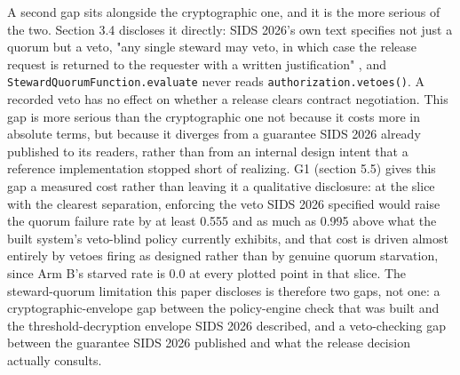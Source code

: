A second gap sits alongside the cryptographic one, and it is the more serious of the two. Section 3.4 discloses it directly: SIDS 2026's own text specifies not just a quorum but a veto, "any single steward may veto, in which case the release request is returned to the requester with a written justification" \cite{katrakazas2026}, and \texttt{StewardQuorumFunction.evaluate} never reads \texttt{authorization.vetoes()}. A recorded veto has no effect on whether a release clears contract negotiation. This gap is more serious than the cryptographic one not because it costs more in absolute terms, but because it diverges from a guarantee SIDS 2026 already published to its readers, rather than from an internal design intent that a reference implementation stopped short of realizing. G1 (section 5.5) gives this gap a measured cost rather than leaving it a qualitative disclosure: at the slice with the clearest separation, enforcing the veto SIDS 2026 specified would raise the quorum failure rate by at least 0.555 and as much as 0.995 above what the built system's veto-blind policy currently exhibits, and that cost is driven almost entirely by vetoes firing as designed rather than by genuine quorum starvation, since Arm B's starved rate is 0.0 at every plotted point in that slice. The steward-quorum limitation this paper discloses is therefore two gaps, not one: a cryptographic-envelope gap between the policy-engine check that was built and the threshold-decryption envelope SIDS 2026 described, and a veto-checking gap between the guarantee SIDS 2026 published and what the release decision actually consults.

